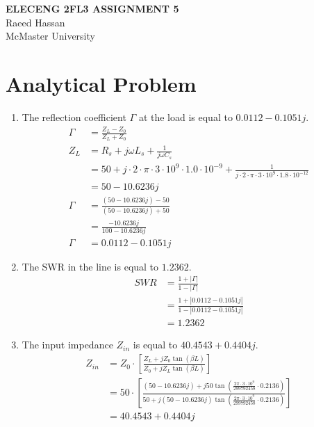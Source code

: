 \documentclass[12pt]{article}
\begin{document}
    \begin{center}
        \textbf{\Large{ELECENG 2FL3 ASSIGNMENT 5}} \\
        \vspace{2mm}
        \large{Raeed Hassan} \\
        McMaster University
    \end{center}
\hrulefill

\section*{Analytical Problem}
\begin{enumerate}[label=\alph*)]
    \item The reflection coefficient $\Gamma$ at the load is equal to $0.0112 - 0.1051j$.
    \[
    \begin{aligned}
        \Gamma &= \frac{Z_L - Z_0}{Z_L + Z_0} \\
        Z_L &= R_s + j\omega L_s + \frac{1}{j\omega C_s} \\
        &= 50 + j\cdot2\cdot\pi\cdot3\cdot10^9\cdot1.0\cdot10^{-9} + \frac{1}{j\cdot2\cdot\pi\cdot3\cdot10^9\cdot1.8\cdot10^{-12}} \\
        &= 50 - 10.6236j \\
        \Gamma &= \frac{(50 - 10.6236j) - 50}{(50 - 10.6236j) + 50} \\
        &= \frac{-10.6236j}{100-10.6236j} \\
        \Gamma &= 0.0112 - 0.1051j
    \end{aligned}
    \]
    \item The SWR in the line is equal to $1.2362$.
    \[
    \begin{aligned}
        SWR &= \frac{1+|\Gamma|}{1-|\Gamma|} \\
        &= \frac{1+|0.0112 - 0.1051j|}{1-|0.0112 - 0.1051j|} \\
        &= 1.2362
    \end{aligned}    
    \]
    \item The input impedance $Z_{in}$ is equal to $40.4543 + 0.4404j$. 
    \[
    \begin{aligned}
        Z_{in} &= Z_0\cdot\left[\frac{Z_L + jZ_0\tan(\beta L)}{Z_0 + jZ_L\tan(\beta L)}\right] \\
        &= 50 \cdot \left[ \frac{(50 - 10.6236j) + j50\tan(\frac{2\pi\cdot3\cdot10^9}{299792458}\cdot 0.2136)}{50 + j(50 - 10.6236j)\tan(\frac{2\pi\cdot3\cdot10^9}{299792458}\cdot 0.2136)} \right] \\
        &= 40.4543 + 0.4404j
    \end{aligned}    
    \]
\end{enumerate}
\end{document}
